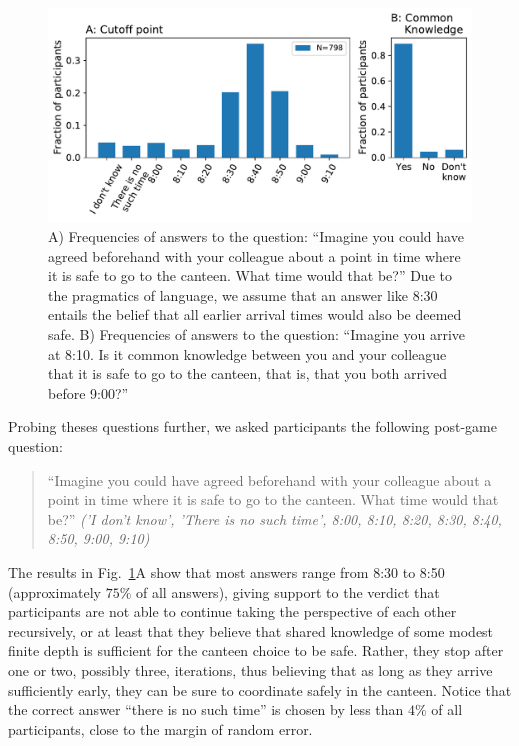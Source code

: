 \documentclass[twocolumn,a4paper,superscriptaddress,nofootinbib]{revtex4}
\begin{document}
\begin{figure} %
\centering\includegraphics[width=1\linewidth]{fig6_cutoff}
\caption{A) Frequencies of answers to the question: ``Imagine you could have agreed beforehand with your colleague about a point in time where it is safe to go to the canteen. What time would that be?'' Due to the pragmatics of language, we assume that an answer like 8:30 entails the belief that all earlier arrival times would also be deemed safe. B) Frequencies of answers to the question: ``Imagine you arrive at 8:10. Is it common knowledge between you and your colleague that it is safe to go to the canteen, that is, that you both arrived before 9:00?''}
\label{fig:5}
\end{figure}
Probing theses questions further, we asked participants the following post-game question:
\begin{quote}
\indent
``Imagine you could have agreed beforehand with your colleague about a point in time where it is safe to go to the canteen. What time would that be?'' \textit{('I don't know', 'There is no such time', 8:00, 8:10, 8:20, 8:30, 8:40, 8:50, 9:00, 9:10)}
\end{quote}
The results in Fig.~\ref{fig:5}A show that most answers range from 8:30 to 8:50 (approximately $75\%$ of all answers), giving support to the verdict that participants are not able to continue taking the perspective of each other recursively, or at least that they believe that shared knowledge of some modest finite depth is sufficient for the canteen choice to be safe. Rather, they stop after one or two, possibly three, iterations, thus believing that as long as they arrive sufficiently early, they can be sure to coordinate safely in the canteen. Notice that the correct answer ``there is no such time'' is chosen by less than $4\%$ of all participants, close to the margin of random error.
\end{document}
